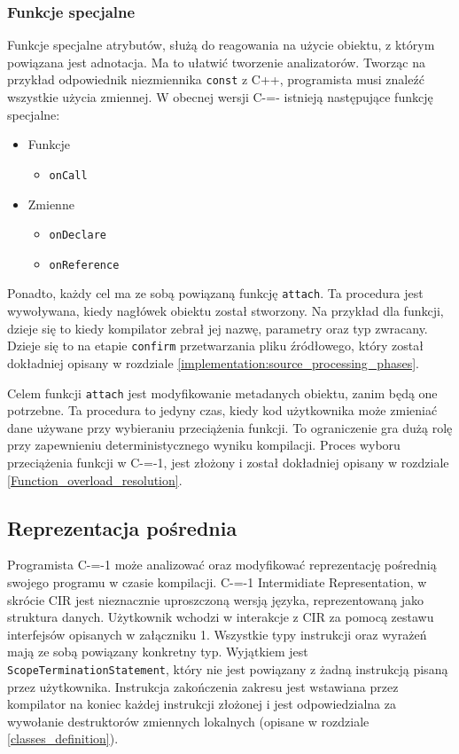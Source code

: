 \subsubsection{Funkcje specjalne}
\label{design:attributes:special_functions}

Funkcje specjalne atrybutów, służą do reagowania na użycie obiektu, z którym powiązana jest adnotacja.
Ma to ułatwić tworzenie analizatorów.
Tworząc na przykład odpowiednik niezmiennika \lstinline{const} z C++, programista musi znaleźć wszystkie użycia zmiennej.
W obecnej wersji C-=- istnieją następujące funkcję specjalne:
\begin{itemize}
	\item Funkcje\begin{itemize}
		\item \lstinline{onCall}
	\end{itemize}
	\item Zmienne\begin{itemize}
		\item \lstinline{onDeclare}
		\item \lstinline{onReference}
	\end{itemize}
\end{itemize}
Ponadto, każdy cel ma ze sobą powiązaną funkcję \lstinline{attach}.
Ta procedura jest wywoływana, kiedy nagłówek obiektu został stworzony.
Na przykład dla funkcji, dzieje się to kiedy kompilator zebrał jej nazwę, parametry oraz typ zwracany.
Dzieje się to na etapie \lstinline{confirm} przetwarzania pliku źródłowego, który został dokładniej opisany w rozdziale \ref{implementation:source_processing_phases}.

Celem funkcji \lstinline{attach} jest modyfikowanie metadanych obiektu, zanim będą one potrzebne.
Ta procedura to jedyny czas, kiedy kod użytkownika może zmieniać dane używane przy wybieraniu przeciążenia funkcji.
To ograniczenie gra dużą rolę przy zapewnieniu deterministycznego wyniku kompilacji.
Proces wyboru przeciążenia funkcji w C-=-1, jest złożony i został dokładniej opisany w rozdziale \ref{Function_overload_resolution}.


\subsection{Reprezentacja pośrednia}\label{reprezentacja_posrednia}
Programista C-=-1 może analizować oraz modyfikować reprezentację pośrednią swojego programu w czasie kompilacji.
C-=-1 Intermidiate Representation, w skrócie CIR jest nieznacznie uproszczoną wersją języka, reprezentowaną jako struktura danych.
Użytkownik wchodzi w interakcje z CIR za pomocą zestawu interfejsów opisanych w załączniku 1.
Wszystkie typy instrukcji oraz wyrażeń mają ze sobą powiązany konkretny typ.
Wyjątkiem jest \lstinline{ScopeTerminationStatement}, który nie jest powiązany z żadną instrukcją pisaną przez użytkownika.
Instrukcja zakończenia zakresu jest wstawiana przez kompilator na koniec każdej instrukcji złożonej i jest odpowiedzialna za wywołanie destruktorów zmiennych lokalnych (opisane w rozdziale \ref{classes_definition}).


